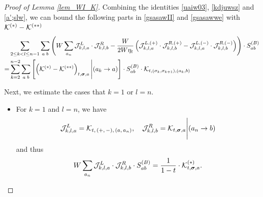 \documentclass[10pt,reqno]{article}
\theoremstyle{plain} %
\theoremstyle{remark}
\numberwithin{equation}{section}
\begin{document}
\begin{proof}[Proof of Lemma \ref{lem_WI_K}]
Combining the identities \eqref{uaiw03}, \eqref{kdjuwsz} and \eqref{a';slw}, we can bound the following parts in \eqref{gsasawII} and \eqref{gsasawwe} with $\cal K^{(*)}-\cal K^{(**)}$ 
\begin{align}\label{WI-pr-Mid}
    & \sum_{  2\le k<l\le n-1} \sum_{a\;b}
    \left( {W}\sum_{a_n} 
        {\cal J}^{L}_{k,l,a}\cdot{\cal J}^{R}_{k,l,b}
        -\frac{W}{2W\eta_t} 
        \left(
        {\cal J}^{L,(+)}_{k,l,a}\cdot{\cal J}^{R,(+)}_{k,l,b}
        -
        {\cal J}^{L,(-)}_{k,l,a}\cdot{\cal J}^{R,(-)}_{k,l,b}
        \right)
        \right)\cdot S^{(B)}_{ab} 
        \\\nonumber
      =  & \sum_{ k=2 }^{n-2} \sum_{a\;b}
        \left[\left({\cal K}^{(*)}-{\cal K}^{(**)}\right)_{t, \boldsymbol{\sigma}, \textbf{a}}\Bigg|(a_k\to a)\right]
        \cdot S^{(B)}_{ab}\cdot  {\cal K}_{t, ( \sigma _k,  \sigma _{k+1}), (a_k,b)}
\end{align}

\bigskip

Next, we estimate the cases that $k=1$ or $l=n$. 

 
\begin{itemize}
\item For $k=1$ and $l=n$, we have 
$$
{\cal J}^L_{k,l,a}  =
 {\cal K}_{t, \,(+,\,-),\, (a,\,a_n)},\quad 
 {\cal J}^R_{k,l,b}={\cal K}_{t, \boldsymbol{\sigma}, \textbf{a}}\Bigg|(a_n\to b)
 $$
 and thus 
 \begin{align}\label{nssfku}
     {W}\sum_{a_n} 
        {\cal J}^{L}_{k,l,a}\cdot{\cal J}^{R}_{k,l,b}\cdot S_{ab}^{(B)}=\frac{1}{1-t}\cdot {\cal K}^{(*)}_{t,\boldsymbol{\sigma},\textbf{a}}.
 \end{align}
 


\end{itemize}
\end{proof}
\end{document}

